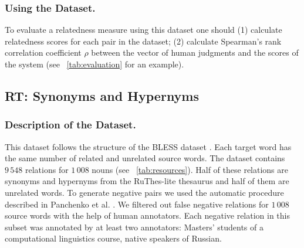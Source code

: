 \documentclass[runningheads,a4paper]{llncs}
\begin{document}



\subsubsection{Using the Dataset.} To evaluate a relatedness measure using this dataset one should (1) calculate relatedness scores for each pair in the dataset; (2) calculate Spearman's rank correlation coefficient $\rho$ between the vector of human judgments and the scores of the  system (see \tablename~\ref{tab:evaluation} for an example). 

\subsection{RT: Synonyms and Hypernyms}\label{sub:rt}

\subsubsection{Description of the Dataset.} This dataset follows the structure of the BLESS dataset \cite{Baroni:11}. Each target word has the same number of related and unrelated source words. The dataset contains $9\,548$ relations for $1\,008$ nouns (see \tablename~\ref{tab:resources}). Half of these relations are synonyms and hypernyms from the RuThes-lite thesaurus \cite{Loukachevitch:14} and half of them are unrelated words. To generate negative pairs we used the automatic procedure described in Panchenko et al. \cite{Panchenko:15}. We filtered out false negative relations for $1\,008$ source words with the help of human annotators. Each negative relation in this subset was annotated by at least two annotators: Masters' students of a computational linguistics course, native speakers of Russian. 
\end{document}
